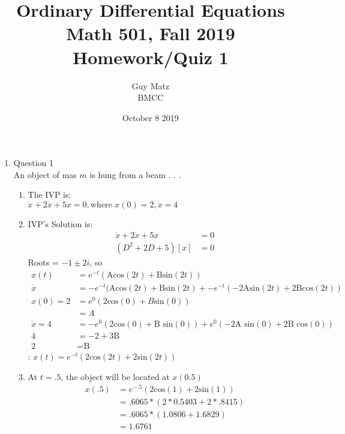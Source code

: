 \documentclass{article}
\title{Ordinary Differential Equations\\
Math 501, Fall 2019\\
Homework/Quiz 1}
\author{Guy Matz \\
BMCC}
\date{October 8 2019}
\begin{document}
\maketitle
\newpage

\begin{enumerate}
    \item Question 1\\
    An object of mas $m$ is hung from a beam . . .
    \begin{enumerate}
        \item The IVP is:\\
        $\ddot{x} + 2 \dot{x} +5x = 0, \text{where } x(0) =2, \dot{x} = 4$
        \item IVP's Solution is:
        \begin{align*}
            \ddot{x} + 2 \dot{x} +5x &= 0 \\
            (D^2 + 2D+ 5)[x] &= 0
        \end{align*}
        Roots = $-1 \pm 2i$, so
        \begin{align*}
            x(t) &= e^{-t}(\text{A} \text{cos}(2t) + \text{B}\text{sin}(2t) )\\
            \dot{x} &= -e^{-t}(\text{A} \text{cos}(2t) + \text{B} \text{sin}(2t) + -e^{-t}(-2\text{A} \text{sin}(2t) + 2 \text{B} \text{cos}(2t) )\\
            x(0) = 2 &= e^0(2\text{cos}(0) + B\text{sin}(0))\\
                     &= A \\
            \dot{x} = 4 &= -e^0(2 \text{cos}(0) + \text{B sin}(0)) + e^0(-2\text{A sin}(0) + 2 \text{B cos}(0)) \\
                      4 &= -2 + 3\text{B}\\
                      2 &= \text{B}
        \end{align*}
    : $x(t) = e^{-t}(2 \text{cos}(2t) + 2 \text{sin}(2t))$
    \item At $t = .5$, the object will be located at $x(0.5)$
    \begin{align*}
    x(.5) &= e^{-.5}(2\text{cos}(1) + 2\text{sin}(1)) \\
          &= .6065* (2 * 0.5403 + 2 * .8415) \\
          &= .6065* ( 1.0806 + 1.6829) \\
          &= 1.6761
    \end{align*}
    \end{enumerate}
    

\end{enumerate}
\end{document}
